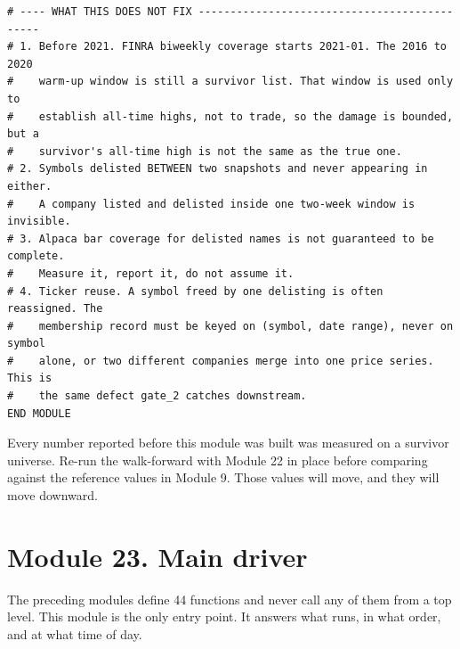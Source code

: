 \documentclass[10pt]{article}
\begin{document}
\begin{lstlisting}
# ---- WHAT THIS DOES NOT FIX ---------------------------------------------
# 1. Before 2021. FINRA biweekly coverage starts 2021-01. The 2016 to 2020
#    warm-up window is still a survivor list. That window is used only to
#    establish all-time highs, not to trade, so the damage is bounded, but a
#    survivor's all-time high is not the same as the true one.
# 2. Symbols delisted BETWEEN two snapshots and never appearing in either.
#    A company listed and delisted inside one two-week window is invisible.
# 3. Alpaca bar coverage for delisted names is not guaranteed to be complete.
#    Measure it, report it, do not assume it.
# 4. Ticker reuse. A symbol freed by one delisting is often reassigned. The
#    membership record must be keyed on (symbol, date range), never on symbol
#    alone, or two different companies merge into one price series. This is
#    the same defect gate_2 catches downstream.
END MODULE
\end{lstlisting}

\vspace{4pt}
\noindent Every number reported before this module was built was measured on a
survivor universe. Re-run the walk-forward with Module 22 in place before
comparing against the reference values in Module 9. Those values will move, and
they will move downward.

\section{Module 23. Main driver}

The preceding modules define 44 functions and never call any of them from a top
level. This module is the only entry point. It answers what runs, in what order,
and at what time of day.
\end{document}
